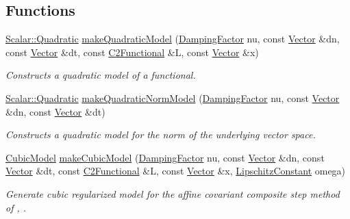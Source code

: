 \subsection*{Functions}
\begin{DoxyCompactItemize}
\item 
\hyperlink{classSpacy_1_1Scalar_1_1Quadratic}{Scalar\-::\-Quadratic} \hyperlink{namespaceSpacy_1_1CompositeStep_a56d3f30088fa92450ffc5f962a8bbfa8}{make\-Quadratic\-Model} (\hyperlink{classSpacy_1_1DampingFactor}{Damping\-Factor} nu, const \hyperlink{classSpacy_1_1Vector}{Vector} \&dn, const \hyperlink{classSpacy_1_1Vector}{Vector} \&dt, const \hyperlink{classSpacy_1_1C2Functional}{C2\-Functional} \&L, const \hyperlink{classSpacy_1_1Vector}{Vector} \&x)
\begin{DoxyCompactList}\small\item\em Constructs a quadratic model of a functional. \end{DoxyCompactList}\item 
\hyperlink{classSpacy_1_1Scalar_1_1Quadratic}{Scalar\-::\-Quadratic} \hyperlink{namespaceSpacy_1_1CompositeStep_a51f121673adedc63020b2ce90041c500}{make\-Quadratic\-Norm\-Model} (\hyperlink{classSpacy_1_1DampingFactor}{Damping\-Factor} nu, const \hyperlink{classSpacy_1_1Vector}{Vector} \&dn, const \hyperlink{classSpacy_1_1Vector}{Vector} \&dt)
\begin{DoxyCompactList}\small\item\em Constructs a quadratic model for the norm of the underlying vector space. \end{DoxyCompactList}\item 
\hyperlink{classSpacy_1_1CompositeStep_1_1CubicModel}{Cubic\-Model} \hyperlink{namespaceSpacy_1_1CompositeStep_a93960636b40b8cf95004a5dc27f961eb}{make\-Cubic\-Model} (\hyperlink{classSpacy_1_1DampingFactor}{Damping\-Factor} nu, const \hyperlink{classSpacy_1_1Vector}{Vector} \&dn, const \hyperlink{classSpacy_1_1Vector}{Vector} \&dt, const \hyperlink{classSpacy_1_1C2Functional}{C2\-Functional} \&L, const \hyperlink{classSpacy_1_1Vector}{Vector} \&x, \hyperlink{classSpacy_1_1LipschitzConstant}{Lipschitz\-Constant} omega)
\begin{DoxyCompactList}\small\item\em Generate cubic regularized model for the affine covariant composite step method of \cite{Lubkoll2015}, \cite{Lubkoll2015a}. \end{DoxyCompactList}\end{DoxyCompactItemize}


